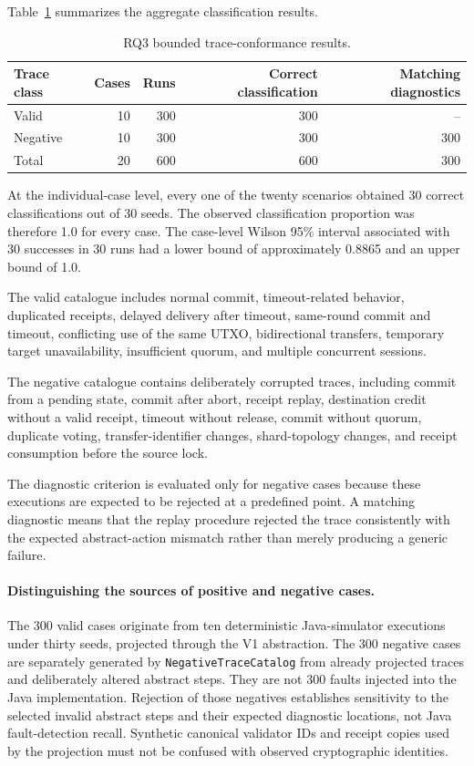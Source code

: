Table~\ref{tab:rq3-summary} summarizes the aggregate classification
results.

\begin{table}[htbp]
\centering
\caption{RQ3 bounded trace-conformance results.}
\label{tab:rq3-summary}
\begin{tabular}{lrrrr}
\hline
Trace class &
Cases &
Runs &
Correct classification &
Matching diagnostics \\
\hline
Valid    & 10 & 300 & 300 & --  \\
Negative & 10 & 300 & 300 & 300 \\
\hline
Total    & 20 & 600 & 600 & 300 \\
\hline
\end{tabular}
\end{table}

At the individual-case level, every one of the twenty scenarios
obtained 30 correct classifications out of 30 seeds. The observed
classification proportion was therefore 1.0 for every case. The
case-level Wilson 95\% interval associated with 30 successes in 30
runs had a lower bound of approximately 0.8865 and an upper bound of
1.0.

The valid catalogue includes normal commit, timeout-related behavior,
duplicated receipts, delayed delivery after timeout, same-round commit
and timeout, conflicting use of the same UTXO, bidirectional
transfers, temporary target unavailability, insufficient quorum, and
multiple concurrent sessions.

The negative catalogue contains deliberately corrupted traces,
including commit from a pending state, commit after abort, receipt
replay, destination credit without a valid receipt, timeout without
release, commit without quorum, duplicate voting, transfer-identifier
changes, shard-topology changes, and receipt consumption before the
source lock.

The diagnostic criterion is evaluated only for negative cases because
these executions are expected to be rejected at a predefined point.
A matching diagnostic means that the replay procedure rejected the
trace consistently with the expected abstract-action mismatch rather
than merely producing a generic failure.

\paragraph{Distinguishing the sources of positive and negative cases.}
The 300 valid cases originate from ten deterministic Java-simulator
executions under thirty seeds, projected through the V1 abstraction. The
300 negative cases are separately generated by \texttt{NegativeTraceCatalog}
from already projected traces and deliberately altered abstract steps.
They are not 300 faults injected into the Java implementation. Rejection of
those negatives establishes sensitivity to the selected invalid abstract
steps and their expected diagnostic locations, not Java fault-detection
recall. Synthetic canonical validator IDs and receipt copies used by the
projection must not be confused with observed cryptographic identities.

